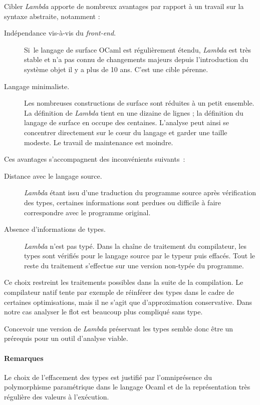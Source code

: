 Cibler \emph{Lambda} apporte de nombreux avantages par rapport à un travail sur
la syntaxe abstraite, notamment :
\begin{description}
  \item[Indépendance vis-à-vis du \emph{front-end}.] Si le langage de surface
    OCaml est régulièrement étendu, \emph{Lambda} est très stable et n'a pas
    connu de changements majeurs depuis l'introduction du système objet il y a
    plus de 10 ans. C'est une cible pérenne.
  \item[Langage minimaliste.]
    Les nombreuses constructions de surface sont réduites à un petit ensemble.
		La définition de \emph{Lambda} tient en une dizaine de lignes ;
		la définition du langage de surface en occupe des centaines.
    L'analyse peut ainsi se concentrer directement sur le cœur du langage et
    garder une taille modeste. Le travail de maintenance est moindre.
\end{description}

Ces avantages s'accompagnent des inconvénients suivants :
\begin{description}
  \item[Distance avec le langage source.] \emph{Lambda} étant issu d'une
    traduction du programme source après vérification des types, certaines
    informations sont perdues ou difficile à faire correspondre avec le
    programme original. 
  \item[Absence d'informations de types.] \emph{Lambda} n'est pas typé. Dans la
    chaîne de traitement du compilateur, les types sont vérifiés pour le
    langage source par le typeur puis effacés. Tout le reste du traitement
    s'effectue sur une version non-typée du programme. 
\end{description}


Ce choix restreint les traitements possibles dans la suite de la compilation.
Le compilateur natif tente par exemple de réinférer des types dans le cadre de
certaines optimisations, mais il ne s'agit que d'approximation conservative.
Dans notre cas analyser le flot est beaucoup plus compliqué sans type.

Concevoir une version de \emph{Lambda} préservant les types semble donc être un
prérequis pour un outil d'analyse viable.

\paragraph{Remarques} Le choix de l'effacement des types est justifié par
l'omniprésence du polymorphisme paramétrique dans le langage Ocaml et de la
représentation très régulière des valeurs à l'exécution.

